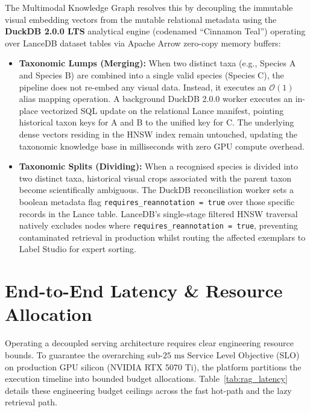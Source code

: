 The Multimodal Knowledge Graph resolves this by decoupling the immutable visual embedding vectors from the mutable relational metadata using the \textbf{DuckDB 2.0.0 LTS} analytical engine (codenamed ``Cinnamon Teal'') operating over LanceDB dataset tables via Apache Arrow zero-copy memory buffers:
\begin{itemize}
    \item \textbf{Taxonomic Lumps (Merging):} When two distinct taxa (e.g., Species A and Species B) are combined into a single valid species (Species C), the pipeline does not re-embed any visual data. Instead, it executes an $\mathcal{O}(1)$ alias mapping operation. A background DuckDB 2.0.0 worker executes an in-place vectorized SQL update on the relational Lance manifest, pointing historical taxon keys for A and B to the unified key for C. The underlying dense vectors residing in the HNSW index remain untouched, updating the taxonomic knowledge base in milliseconds with zero GPU compute overhead.
    \item \textbf{Taxonomic Splits (Dividing):} When a recognised species is divided into two distinct taxa, historical visual crops associated with the parent taxon become scientifically ambiguous. The DuckDB reconciliation worker sets a boolean metadata flag \texttt{requires\_reannotation = true} over those specific records in the Lance table. LanceDB's single-stage filtered HNSW traversal natively excludes nodes where \texttt{requires\_reannotation = true}, preventing contaminated retrieval in production whilst routing the affected exemplars to Label Studio for expert sorting.
\end{itemize}

\section{End-to-End Latency \& Resource Allocation}
\label{sec:latency_budget}

Operating a decoupled serving architecture requires clear engineering resource bounds. To guarantee the overarching sub-$25\text{ ms}$ Service Level Objective (SLO) on production GPU silicon (NVIDIA RTX 5070 Ti), the platform partitions the execution timeline into bounded budget allocations. Table~\ref{tab:rag_latency} details these engineering budget ceilings across the fast hot-path and the lazy retrieval path.

